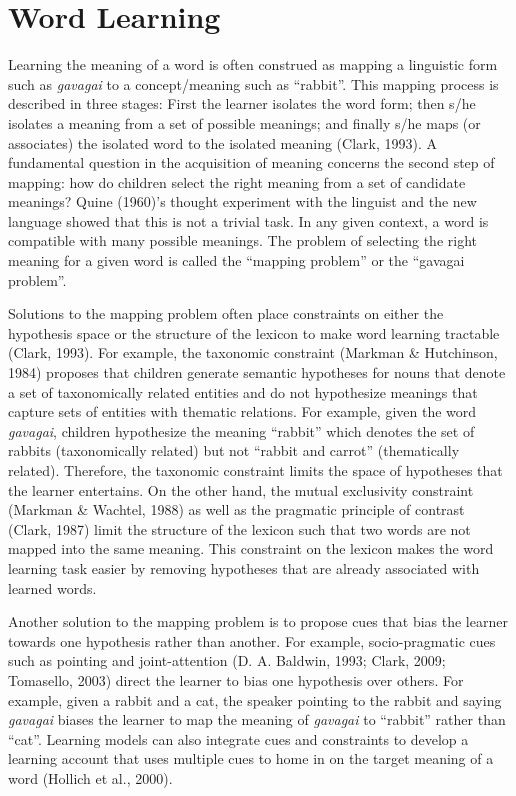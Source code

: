 \documentclass[oneside]{report}
\theoremstyle{definition}
\theoremstyle{definition}
\theoremstyle{definition}
\theoremstyle{remark}
\begin{document}
\section{Word Learning}\label{word-learning}

Learning the meaning of a word is often construed as mapping a
linguistic form such as \emph{gavagai} to a concept/meaning such as
``rabbit''. This mapping process is described in three stages: First the
learner isolates the word form; then s/he isolates a meaning from a set
of possible meanings; and finally s/he maps (or associates) the isolated
word to the isolated meaning (Clark, 1993). A fundamental question in
the acquisition of meaning concerns the second step of mapping: how do
children select the right meaning from a set of candidate meanings?
Quine (1960)'s thought experiment with the linguist and the new language
showed that this is not a trivial task. In any given context, a word is
compatible with many possible meanings. The problem of selecting the
right meaning for a given word is called the ``mapping problem'' or the
``gavagai problem''.

Solutions to the mapping problem often place constraints on either the
hypothesis space or the structure of the lexicon to make word learning
tractable (Clark, 1993). For example, the taxonomic constraint (Markman
\& Hutchinson, 1984) proposes that children generate semantic hypotheses
for nouns that denote a set of taxonomically related entities and do not
hypothesize meanings that capture sets of entities with thematic
relations. For example, given the word \emph{gavagai}, children
hypothesize the meaning ``rabbit'' which denotes the set of rabbits
(taxonomically related) but not ``rabbit and carrot'' (thematically
related). Therefore, the taxonomic constraint limits the space of
hypotheses that the learner entertains. On the other hand, the mutual
exclusivity constraint (Markman \& Wachtel, 1988) as well as the
pragmatic principle of contrast (Clark, 1987) limit the structure of the
lexicon such that two words are not mapped into the same meaning. This
constraint on the lexicon makes the word learning task easier by
removing hypotheses that are already associated with learned words.

Another solution to the mapping problem is to propose cues that bias the
learner towards one hypothesis rather than another. For example,
socio-pragmatic cues such as pointing and joint-attention (D. A.
Baldwin, 1993; Clark, 2009; Tomasello, 2003) direct the learner to bias
one hypothesis over others. For example, given a rabbit and a cat, the
speaker pointing to the rabbit and saying \emph{gavagai} biases the
learner to map the meaning of \emph{gavagai} to ``rabbit'' rather than
``cat''. Learning models can also integrate cues and constraints to
develop a learning account that uses multiple cues to home in on the
target meaning of a word (Hollich et al., 2000).
\end{document}
